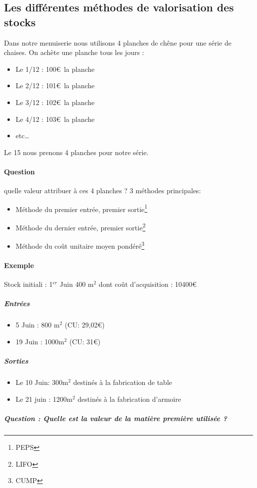 \documentclass[12pt,a4paper,openany]{report}
\begin{document}
	 \subsection{Les différentes méthodes de valorisation des stocks}
	 Dans notre menuiserie nous utilisons 4 planches de chêne pour une série de chaises. 
	 On achète une planche tous les jours : 
	 \begin{itemize}
		 \item Le 1/12 : 100\euro~la planche
		 \item Le 2/12 : 101\euro~la planche
		 \item Le 3/12 : 102\euro~la planche
		 \item Le 4/12 : 103\euro~la planche
		 \item etc\ldots
	 \end{itemize}
	 Le 15 nous prenons 4 planches pour notre série.
	 \paragraph{Question} quelle valeur attribuer à ces 4 planches ?  3 méthodes principales:
	 \begin{itemize}
		 \item Méthode du premier entrée, premier sortie\footnote{PEPS}
		 \item Méthode du dernier entrée, premier sortie\footnote{LIFO}
		 \item Méthode du coût unitaire moyen pondéré\footnote{CUMP}
	 \end{itemize}
	 \paragraph{Exemple}
	 Stock initiali : 1$^{er}$ Juin 400 m$^2$ dont coût d'acquisition : 10400\euro
	 \subparagraph{Entrées}
	 \begin{itemize}
		 \item 5 Juin : 800 m$^2$ (CU: 29,02\euro)
		 \item 19 Juin : 1000m$^2$ (CU: 31\euro)
	 \end{itemize}
	 \subparagraph{Sorties}
	 \begin{itemize}
		 \item Le 10 Juin: 300m$^2$ destinés à la fabrication de table
		 \item Le 21 juin : 1200m$^2$ destinés à la fabrication d'armoire
	 \end{itemize}
	 \subparagraph{Question : Quelle est la valeur de la matière première utilisée ?}
\end{document}
